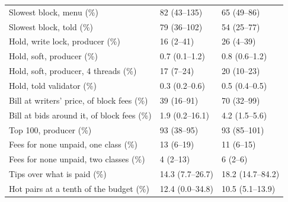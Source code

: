 \begin{table}[t]
\begin{tabular}{@{}lll@{}}
Slowest block, menu (\%) & 82 (43--135) & 65 (49--86) \\
Slowest block, told (\%) & 79 (36--102) & 54 (25--77) \\
Hold, write lock, producer (\%) & 16 (2--41) & 26 (4--39) \\
Hold, soft, producer (\%) & 0.7 (0.1--1.2) & 0.8 (0.6--1.2) \\
Hold, soft, producer, 4 threads (\%) & 17 (7--24) & 20 (10--23) \\
Hold, told validator (\%) & 0.3 (0.2--0.6) & 0.5 (0.4--0.5) \\
Bill at writers' price, of block fees (\%) & 39 (16--91) & 70 (32--99) \\
Bill at bids around it, of block fees (\%) & 1.9 (0.2--16.1) & 4.2 (1.5--5.6) \\
Top 100, producer (\%) & 93 (38--95) & 93 (85--101) \\
Fees for none unpaid, one class (\%) & 13 (6--19) & 11 (6--15) \\
Fees for none unpaid, two classes (\%) & 4 (2--13) & 6 (2--6) \\
Tips over what is paid (\%) & 14.3 (7.7--26.7) & 18.2 (14.7--84.2) \\
Hot pairs at a tenth of the budget (\%) & 12.4 (0.0--34.8) & 10.5 (5.1--13.9) \\
\bottomrule
\end{tabular}
\end{table}
